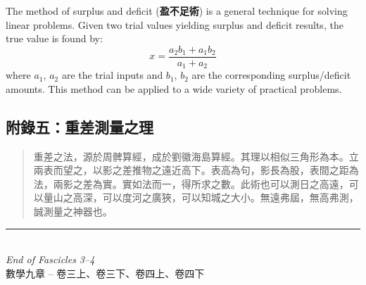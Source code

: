 \documentclass[11pt,a4paper]{article}
\begin{document}
The method of surplus and deficit (\textbf{盈不足術}) is a general technique for 
solving linear problems. Given two trial values yielding surplus and deficit 
results, the true value is found by:
\[
x = \frac{a_2b_1 + a_1b_2}{a_1 + a_2}
\]
where $a_1$, $a_2$ are the trial inputs and $b_1$, $b_2$ are the 
corresponding surplus/deficit amounts. This method can be applied to 
a wide variety of practical problems.

\subsection*{附錄五：重差測量之理}

\begin{quote}
\textcolor{chinacolor}{%
重差之法，源於周髀算經，成於劉徽海島算經。其理以相似三角形為本。立兩表而望之，以影之差推物之遠近高下。表高為句，影長為股，表間之距為法，兩影之差為實。實如法而一，得所求之數。此術也可以測日之高遠，可以量山之高深，可以度河之廣狹，可以知城之大小。無遠弗屆，無高弗測，誠測量之神器也。
}
\end{quote}

\vspace{1cm}

\begin{center}
{\color{rulecolor}\rule{8cm}{0.4pt}}\\[0.5cm]
{\small\textit{End of Fascicles 3--4}}\\[0.3cm]
{\small 數學九章 -- 卷三上、卷三下、卷四上、卷四下}
\end{center}
\end{document}
